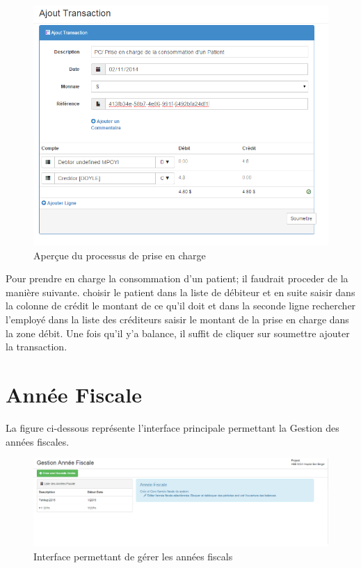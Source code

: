 \documentclass[12pt,a4paper]{report}
\begin{document}
\begin{figure}[h]
\begin{center}
\includegraphics[width=12cm]{pic/ATPriseEnCharge.png}
\end{center}
\caption{Aperçue du processus de prise en charge}
\label{Aperçue du processus de prise en charge}
\end{figure}

Pour prendre en charge la consommation d'un patient; il faudrait proceder de la manière suivante. choisir le patient dans la liste de débiteur et en suite saisir dans la colonne de crédit le montant de ce qu'il doit et dans la seconde ligne rechercher l'employé dans la liste des créditeurs saisir le montant de la prise en charge dans la zone débit.
Une fois qu'il y'a balance, il suffit de cliquer sur soumettre ajouter la transaction.

\newpage
\section{Année Fiscale}
La figure ci-dessous représente l'interface principale permettant la Gestion des années fiscales. 
\begin{figure}[h]
\begin{center}
\includegraphics[width=14cm]{pic/AnneeFiscal.png}
\end{center}
\caption{Interface permettant de gérer les années fiscals}
\label{Interface permettant de gérer les années fiscals}
\end{figure}
\end{document}
